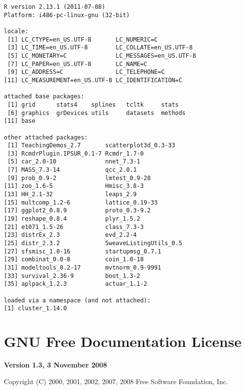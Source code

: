 \documentclass[captions=tableheading]{scrbook}
\begin{document}
\begin{verbatim}
R version 2.13.1 (2011-07-08)
Platform: i486-pc-linux-gnu (32-bit)

locale:
 [1] LC_CTYPE=en_US.UTF-8       LC_NUMERIC=C              
 [3] LC_TIME=en_US.UTF-8        LC_COLLATE=en_US.UTF-8    
 [5] LC_MONETARY=C              LC_MESSAGES=en_US.UTF-8   
 [7] LC_PAPER=en_US.UTF-8       LC_NAME=C                 
 [9] LC_ADDRESS=C               LC_TELEPHONE=C            
[11] LC_MEASUREMENT=en_US.UTF-8 LC_IDENTIFICATION=C       

attached base packages:
 [1] grid      stats4    splines   tcltk     stats    
 [6] graphics  grDevices utils     datasets  methods  
[11] base     

other attached packages:
 [1] TeachingDemos_2.7       scatterplot3d_0.3-33   
 [3] RcmdrPlugin.IPSUR_0.1-7 Rcmdr_1.7-0            
 [5] car_2.0-10              nnet_7.3-1             
 [7] MASS_7.3-14             qcc_2.0.1              
 [9] prob_0.9-2              lmtest_0.9-28          
[11] zoo_1.6-5               Hmisc_3.8-3            
[13] HH_2.1-32               leaps_2.9              
[15] multcomp_1.2-6          lattice_0.19-33        
[17] ggplot2_0.8.9           proto_0.3-9.2          
[19] reshape_0.8.4           plyr_1.5.2             
[21] e1071_1.5-26            class_7.3-3            
[23] distrEx_2.3             evd_2.2-4              
[25] distr_2.3.2             SweaveListingUtils_0.5 
[27] sfsmisc_1.0-16          startupmsg_0.7.1       
[29] combinat_0.0-8          coin_1.0-18            
[31] modeltools_0.2-17       mvtnorm_0.9-9991       
[33] survival_2.36-9         boot_1.3-2             
[35] aplpack_1.2.3           actuar_1.1-2           

loaded via a namespace (and not attached):
[1] cluster_1.14.0
\end{verbatim}

\vfill{}
\chapter{GNU Free Documentation License}
\label{sec-3}

\label{cha:GNU-Free-Documentation}

\begin{center}
\textbf{\large Version 1.3, 3 November 2008}\bigskip{}

\par\end{center}

\noindent Copyright (C) 2000, 2001, 2002, 2007, 2008 Free Software
Foundation, Inc.
\end{document}
